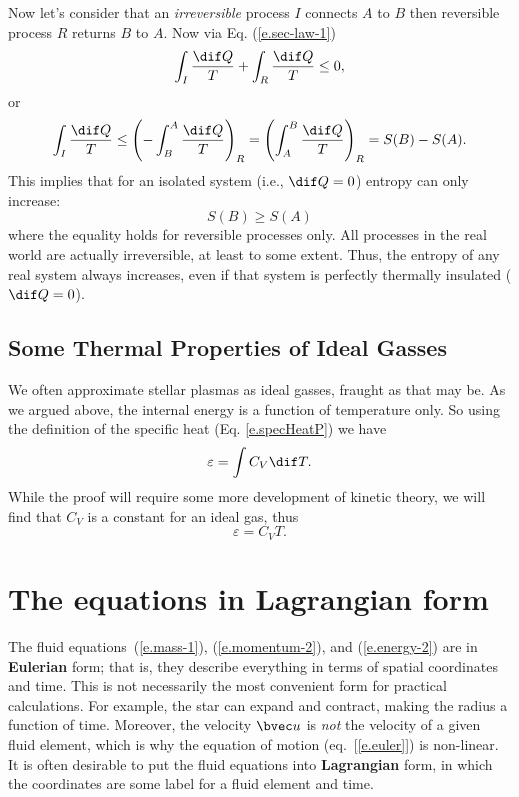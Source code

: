Now let's consider that an {\it irreversible} process $I$ connects $A$ to $B$ then reversible process $R$ returns $B$ to $A$.
Now via Eq. (\ref{e.sec-law-1})
\begin{equation}
	\int_I \frac{\dif Q}{T} + \int_R\frac{\dif Q}{T} \leq 0,
\end{equation}
or
\begin{equation}
	\int_I \frac{\dif Q}{T} \leq \left(-\int_B^A\frac{\dif Q}{T}\right)_R = \left(\int_A^B\frac{\dif Q}{T}\right)_R = S(B) - S(A).
\end{equation}
This implies that for an isolated system (i.e., $\dif Q=0$) entropy can only increase:
\[
	S(B) \geq S(A)
\]
where the equality holds for reversible processes only.
All processes in the real world are actually irreversible, at least to some extent.
Thus, the entropy of any real system always increases, even if that system is perfectly thermally insulated ($\dif Q=0$).

\subsection{Some Thermal Properties of Ideal Gasses}

We often approximate stellar plasmas as ideal gasses, fraught as that may be.
As we argued above, the internal energy is a function of temperature only.
So using the definition of the specific heat (Eq. \ref{e.specHeatP}) we have
\begin{equation}
	\varepsilon = \int C_V \dif T.
\end{equation}
While the proof will require some more development of kinetic theory, we will find that $C_V$ is a constant for an ideal gas, thus
\begin{equation}
	\varepsilon = C_V T.
\end{equation}



\section{The equations in Lagrangian form}

The fluid equations~(\ref{e.mass-1}), (\ref{e.momentum-2}), and (\ref{e.energy-2}) are in \textbf{Eulerian} form; that is, they describe everything in terms of spatial coordinates and time. This is not necessarily the most convenient form for  practical calculations. For example, the star can expand and contract, making the radius a function of time. Moreover, the velocity $\vu$ is \emph{not} the velocity of a given fluid element, which is why the equation of motion (eq.~[\ref{e.euler}]) is non-linear. It is often desirable to put the fluid equations into \textbf{Lagrangian} form, in which the coordinates are some label for a fluid element and time.

